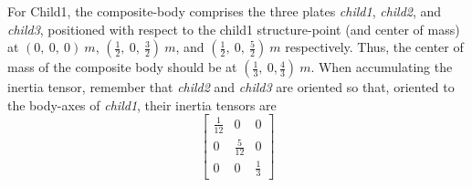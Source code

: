 \begin{description}
For Child1, the composite-body comprises the three plates \textit{child1}, 
\textit{child2}, and \textit{child3}, positioned with respect to the child1 
structure-point (and center of mass) at $(0,~0,~0)~m$, 
$(\frac{1}{2},~0,~\frac{3}{2})~m$, and $(\frac{1}{2},~0,~\frac{5}{2})~m$ 
respectively.  Thus, the center of mass of the composite body should be at 
$(\frac{1}{3},~0,\frac{4}{3})~m$.  When accumulating the inertia tensor, 
remember that \textit{child2} and \textit{child3} are oriented so that, 
oriented to the body-axes of \textit{child1}, their inertia tensors are 
\begin{equation*}
\begin{bmatrix} \frac{1}{12} & 0   & 0  \\
                   0  & \frac{5}{12} & 0   \\
                    0  & 0   & \frac{1}{3} 
   \end{bmatrix}
\end{equation*} 


\end{description}

